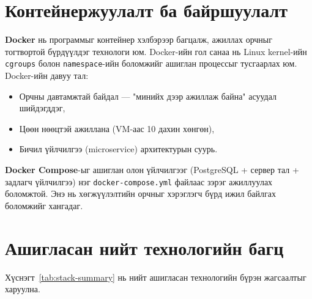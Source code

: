 \section{Контейнержуулалт ба байршуулалт}
\textbf{Docker} \cite{docker} нь программыг контейнер хэлбэрээр багцалж, ажиллах орчныг тогтвортой бүрдүүлдэг технологи юм. Docker-ийн гол санаа нь Linux kernel-ийн \texttt{cgroups} болон \texttt{namespace}-ийн боломжийг ашиглан процессыг тусгаарлах юм. Docker-ийн давуу тал:
\begin{itemize}
    \item Орчны давтамжтай байдал --- "минийх дээр ажиллаж байна" асуудал шийдэгддэг,
    \item Цөөн нөөцтэй ажиллана (VM-аас 10 дахин хөнгөн),
    \item Бичил үйлчилгээ (microservice) архитектурын суурь.
\end{itemize}

\textbf{Docker Compose}-ыг ашиглан олон үйлчилгээг (PostgreSQL + сервер тал + задлагч үйлчилгээ) нэг \texttt{docker-compose.yml} файлаас зэрэг ажиллуулах боломжтой. Энэ нь хөгжүүлэлтийн орчныг хэрэглэгч бүрд ижил байлгах боломжийг хангадаг.

\section{Ашигласан нийт технологийн багц}
Хүснэгт~\ref{tab:stack-summary} нь нийт ашигласан технологийн бүрэн жагсаалтыг харуулна.

